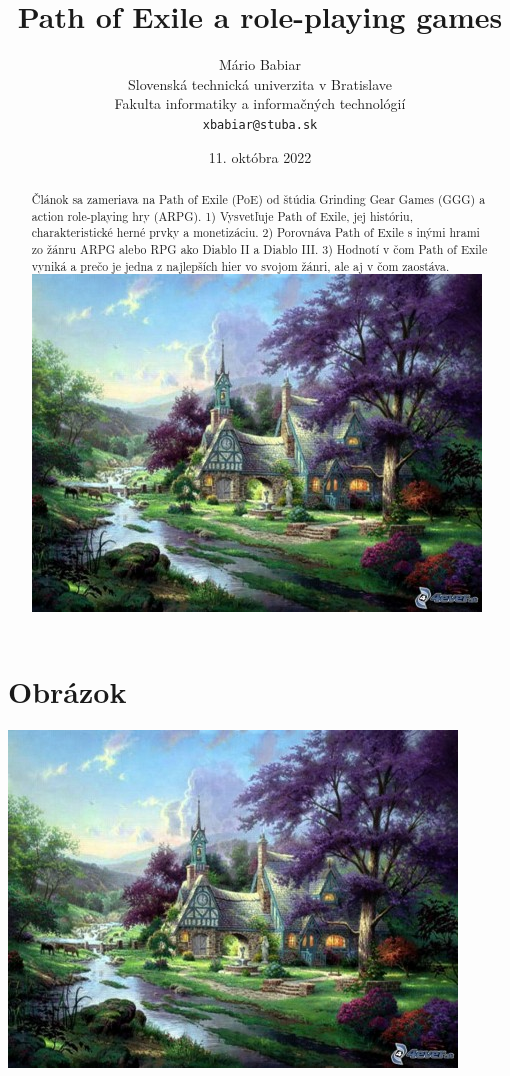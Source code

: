 \documentclass[10pt,twoside,slovak,a4paper]{article}
\title{Path of Exile a role-playing games}
\author{Mário Babiar\\[2pt]
	{\small Slovenská technická univerzita v Bratislave}\\
	{\small Fakulta informatiky a informačných technológií}\\
	{\small \texttt{xbabiar@stuba.sk}}
	}
\date{\small 11. októbra 2022}
\begin{document}
\maketitle

\begin{abstract}
Článok sa zameriava na Path of Exile (PoE) od štúdia Grinding Gear Games (GGG) a action role-playing hry (ARPG). 1) Vysvetľuje Path of Exile, jej históriu, charakteristické herné prvky a monetizáciu. 2) Porovnáva Path of Exile s inými hrami zo žánru ARPG alebo RPG ako Diablo II a Diablo III. 3) Hodnotí v čom Path of Exile vyniká a prečo je jedna z najlepších hier vo svojom žánri, ale aj v čom zaostáva.
\centering
\includegraphics[scale=0.5,]{obrazok.jpg}
\end{abstract}
\section{Obrázok}
\includegraphics[scale=0.5]{obrazok.jpg}
\end{document}
